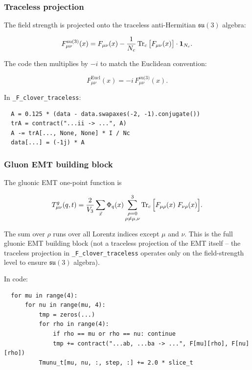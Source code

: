 \documentclass[11pt,a4paper]{article}
\newcommand{\code}[1]{\texttt{#1}}
\begin{document}
\subsubsection{Traceless projection}

The field strength is projected onto the traceless anti-Hermitian $\mathfrak{su}(3)$ algebra:

\begin{equation}\label{eq:F_traceless}
  F_{\mu\nu}^{\text{su(3)}}(x)
    = F_{\mu\nu}(x) - \frac{1}{N_c} \Tr_c\big[F_{\mu\nu}(x)\big] \cdot \mathbf{1}_{N_c}.
\end{equation}

The code then multiplies by $-i$ to match the Euclidean convention:

\begin{equation}\label{eq:F_minus_i}
  F_{\mu\nu}^{\text{Eucl}}(x) = -i\, F_{\mu\nu}^{\text{su(3)}}(x).
\end{equation}

In \code{\_F\_clover\_traceless}:
\begin{verbatim}
  A = 0.125 * (data - data.swapaxes(-2, -1).conjugate())
  trA = contract("...ii -> ...", A)
  A -= trA[..., None, None] * I / Nc
  data[...] = (-1j) * A
\end{verbatim}

\subsubsection{Gluon EMT building block}

The gluonic EMT one-point function is

\begin{equation}\label{eq:Tmunu_gluon}
  T_{\mu\nu}^g(q, t)
    = \frac{2}{V_3} \sum_{\vec{x}} \Phi_q(x)
      \sum_{\substack{\rho=0\\ \rho \neq \mu,\nu}}^{3}
      \Tr_c\Big[
        F_{\mu\rho}(x)\; F_{\nu\rho}(x)
      \Big].
\end{equation}

The sum over $\rho$ runs over all Lorentz indices except $\mu$ and $\nu$. This is the full gluonic EMT building block (not a traceless projection of the EMT itself -- the traceless projection in \code{\_F\_clover\_traceless} operates only on the field-strength level to ensure $\mathfrak{su}(3)$ algebra).

In code:
\begin{verbatim}
  for mu in range(4):
      for nu in range(mu, 4):
          tmp = zeros(...)
          for rho in range(4):
              if rho == mu or rho == nu: continue
              tmp += contract("...ab, ...ba -> ...", F[mu][rho], F[nu][rho])
          Tmunu_t[mu, nu, :, step, :] += 2.0 * slice_t
\end{verbatim}
\end{document}
